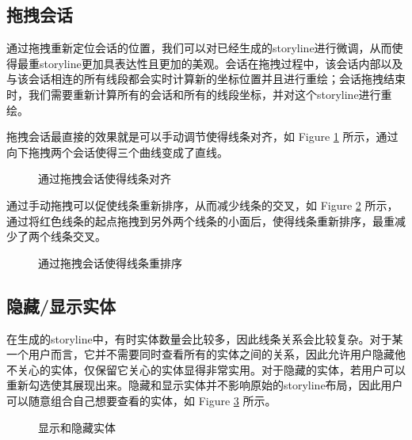 \subsection{拖拽会话}
通过拖拽重新定位会话的位置，我们可以对已经生成的storyline进行微调，从而使得最重storyline更加具表达性且更加的美观。会话在拖拽过程中，该会话内部以及与该会话相连的所有线段都会实时计算新的坐标位置并且进行重绘；会话拖拽结束时，我们需要重新计算所有的会话和所有的线段坐标，并对这个storyline进行重绘。

拖拽会话最直接的效果就是可以手动调节使得线条对齐，如 Figure \ref{fig:drag-to-realignment} 所示，通过向下拖拽两个会话使得三个曲线变成了直线。
\begin{figure}[htb]
	\centering
	\caption{通过拖拽会话使得线条对齐}
	\label{fig:drag-to-realignment}
\end{figure}

通过手动拖拽可以促使线条重新排序，从而减少线条的交叉，如 Figure \ref{fig:drag-to-reorder} 所示，通过将红色线条的起点拖拽到另外两个线条的小面后，使得线条重新排序，最重减少了两个线条交叉。
\begin{figure}[htb]
	\centering
	\caption{通过拖拽会话使得线条重排序}
	\label{fig:drag-to-reorder}
\end{figure}

\subsection{隐藏/显示实体}
在生成的storyline中，有时实体数量会比较多，因此线条关系会比较复杂。对于某一个用户而言，它并不需要同时查看所有的实体之间的关系，因此允许用户隐藏他不关心的实体，仅保留它关心的实体显得非常实用。对于隐藏的实体，若用户可以重新勾选使其展现出来。隐藏和显示实体并不影响原始的storyline布局，因此用户可以随意组合自己想要查看的实体，如 Figure \ref{fig:hide-character} 所示。
\begin{figure}[htb]
	\centering
	\caption{显示和隐藏实体}
	\label{fig:hide-character}
\end{figure}

